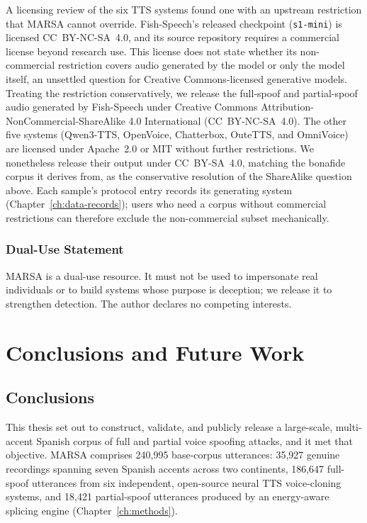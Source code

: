\documentclass[11pt]{report}
\begin{document}
A licensing review of the six TTS systems found one with an upstream
restriction that MARSA cannot override. Fish-Speech's released
checkpoint (\texttt{s1-mini}) is licensed CC~BY-NC-SA~4.0, and its
source repository requires a commercial license beyond research use.
This license does not state whether its non-commercial restriction
covers audio generated by the model or only the model itself, an
unsettled question for Creative Commons-licensed generative models.
Treating the restriction conservatively, we release the full-spoof and
partial-spoof audio generated by Fish-Speech under Creative Commons
Attribution-NonCommercial-ShareAlike 4.0 International
(CC~BY-NC-SA~4.0). The other five systems (Qwen3-TTS, OpenVoice,
Chatterbox, OuteTTS, and OmniVoice) are licensed under Apache~2.0 or
MIT without further restrictions. We nonetheless release their output
under CC~BY-SA~4.0, matching the bonafide corpus it derives from, as
the conservative resolution of the ShareAlike question above. Each
sample's protocol entry records its generating system
(Chapter~\ref{ch:data-records}); users who need a corpus without
commercial restrictions can therefore exclude the non-commercial subset
mechanically.

\subsection{Dual-Use Statement}

MARSA is a dual-use resource. It must not be used to
impersonate real individuals or to build systems whose purpose is
deception; we release it to strengthen detection. The author declares no
competing interests.

\chapter{Conclusions and Future Work}
\label{ch:conclusions}

\section{Conclusions}

This thesis set out to construct, validate, and publicly
release a large-scale, multi-accent Spanish corpus of full and partial
voice spoofing attacks, and it met that objective. MARSA comprises
240{,}995 base-corpus utterances: 35{,}927 genuine recordings spanning
seven Spanish accents across two continents, 186{,}647 full-spoof
utterances from six independent, open-source neural TTS voice-cloning
systems, and 18{,}421 partial-spoof utterances produced by an
energy-aware splicing engine (Chapter~\ref{ch:methods}).
\end{document}
